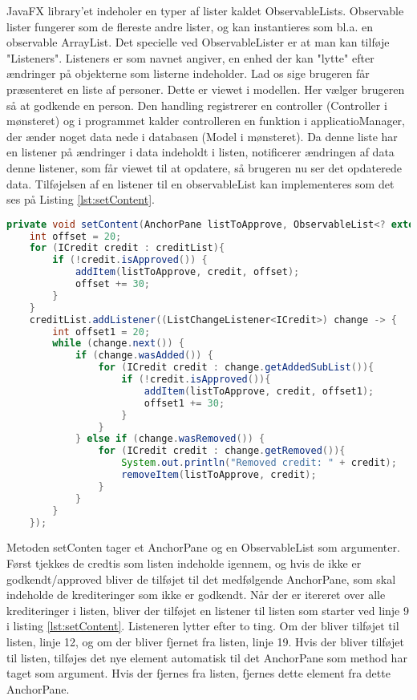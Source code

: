 JavaFX library'et indeholer en typer af lister kaldet ObservableLists. Observable lister fungerer som de flereste andre lister, og kan instantieres som bl.a. en observable ArrayList. Det specielle ved ObservableLister er at man kan tilføje "Listeners". Listeners er som navnet angiver, en enhed der kan "lytte" efter ændringer på objekterne som listerne indeholder. Lad os sige brugeren får præsenteret en liste af personer. Dette er viewet i modellen. Her vælger brugeren så at godkende en person. Den handling registrerer en controller (Controller i mønsteret) og i programmet kalder controlleren en funktion i applicatioManager, der ænder noget data nede i databasen (Model i mønsteret). Da denne liste har en listener på ændringer i data indeholdt i listen, notificerer ændringen af data denne listener, som får viewet til at opdatere, så brugeren nu ser det opdaterede data.
Tilføjelsen af en listener til en observableList kan implementeres som det ses på Listing \ref{lst:setContent}.

\begin{lstlisting}[language=Java, label=lst:setContent, caption = setContent]
private void setContent(AnchorPane listToApprove, ObservableList<? extends ICredit> creditList){
    int offset = 20;
    for (ICredit credit : creditList){
        if (!credit.isApproved()) {
            addItem(listToApprove, credit, offset);
            offset += 30;
        }
    }
    creditList.addListener((ListChangeListener<ICredit>) change -> {
        int offset1 = 20;
        while (change.next()) {
            if (change.wasAdded()) {
                for (ICredit credit : change.getAddedSubList()){
                    if (!credit.isApproved()){
                        addItem(listToApprove, credit, offset1);
                        offset1 += 30;
                    }
                }
            } else if (change.wasRemoved()) {
                for (ICredit credit : change.getRemoved()){
                    System.out.println("Removed credit: " + credit);
                    removeItem(listToApprove, credit);
                }
            }
        }
    });
\end{lstlisting}

Metoden setConten tager et AnchorPane og en ObservableList som argumenter. Først tjekkes de credtis som listen indeholde igennem, og hvis de ikke er godkendt/approved bliver de tilføjet til det medfølgende AnchorPane, som skal indeholde de krediteringer som ikke er godkendt. Når der er itereret over alle krediteringer i listen, bliver der tilføjet en listener til listen som starter ved linje 9 i listing \ref{lst:setContent}. Listeneren lytter efter to ting. Om der bliver tilføjet til listen, linje 12, og om der bliver fjernet fra listen, linje 19. Hvis der bliver tilføjet til listen, tilføjes det nye element automatisk til det AnchorPane som method har taget som argument. Hvis der fjernes fra listen, fjernes dette element fra dette AnchorPane.
